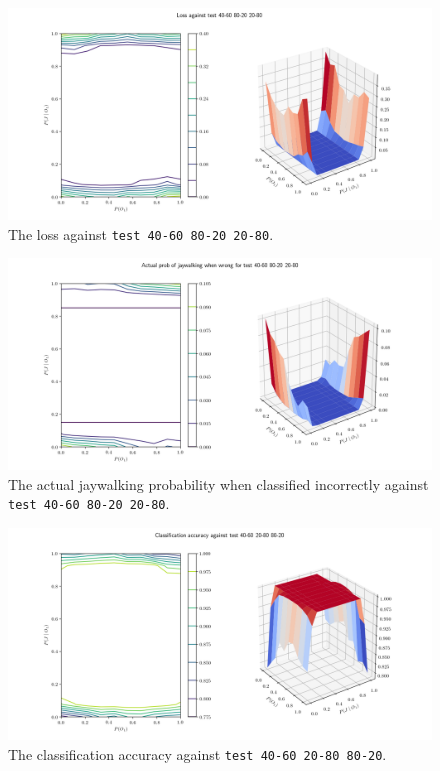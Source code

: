 \documentclass{report}
\newcommand{\code}{\texttt}
\begin{document}
\begin{figure}[h]
    \centering
    \centerline{\includegraphics[scale=0.55]{test_40-60_80-20_20-80_loss.png}}
    \caption[]{The loss against \code{test 40-60 80-20 20-80}.}
    \label{fig:test_40-60_80-20_20-80_loss_plot}
\end{figure}

\begin{figure}[h]
    \centering
    \centerline{\includegraphics[scale=0.55]{test_40-60_80-20_20-80_jay_prob.png}}
    \caption[]{The actual jaywalking probability when classified incorrectly against \code{test 40-60 80-20 20-80}.}
    \label{fig:test_40-60_80-20_20-80_jay_prob_plot}
\end{figure}

% 
% 

\begin{figure}[h]
    \centering
    \centerline{\includegraphics[scale=0.55]{test_40-60_20-80_80-20_accuracy.png}}
    \caption[]{The classification accuracy against \code{test 40-60 20-80 80-20}.}
    \label{fig:test_40-60_20-80_80-20_accuracy_plot}
\end{figure}
\end{document}
